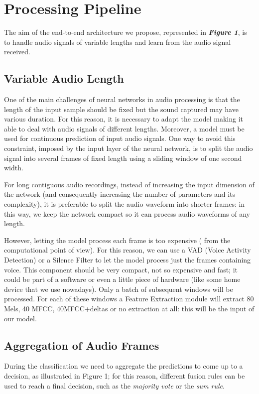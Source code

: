 \documentclass[conference]{IEEEtran}
\begin{document}
\section{Processing Pipeline}
The aim of the end-to-end architecture we propose, represented in \textbf{\textit{Figure 1}}, is to handle audio signals of variable lengths and learn from the audio signal received.
\subsection{Variable Audio Length}
One of the main challenges of neural networks in audio processing is that the length of the input sample should be fixed but the sound captured may have various duration. For this reason, it is necessary to adapt the model making it able to deal with audio signals of different lengths. Moreover, a model must be used for continuous prediction of input audio signals. One way to avoid this constraint, imposed by the input layer of the neural network, is to split the audio signal into several frames of fixed length using a sliding window of one second width.

For long contiguous audio recordings, instead of increasing the input dimension of the network (and consequently increasing the number of parameters and its complexity), it is preferable to split the audio waveform into shorter frames: in this way, we keep the network compact so it can process audio waveforms of any length.

However, letting the model process each frame is too expensive ( from the computational point of view). For this reason, we can use a VAD (Voice Activity Detection) or a Silence Filter to let the model process just the frames containing voice. This component should be very compact, not so expensive and fast; it could be part of a software or even a little piece of hardware (like some home device that we use nowadays).
Only a batch of subsequent windows will be processed. For each of these windows a Feature Extraction module will extract 80 Mels, 40 MFCC, 40MFCC+deltas or no extraction at all: this will be the input of our model.

\subsection{Aggregation of Audio Frames}
During the classification we need to aggregate the predictions to come up to a decision, as illustrated in Figure 1; for this reason, different fusion rules can be used to reach a final decision, such as the \textit{majority vote} or the \textit{sum rule}.
\end{document}
